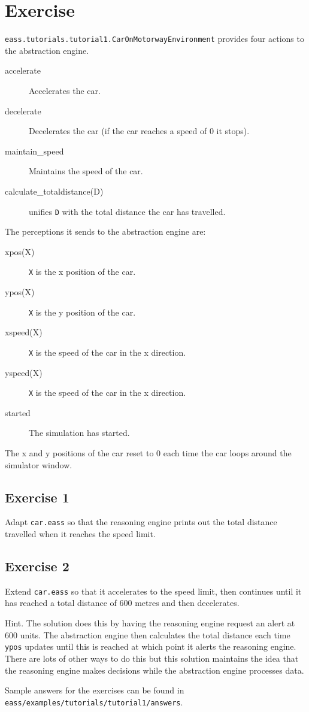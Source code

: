 \section{Exercise}

\texttt{eass.tutorials.tutorial1.CarOnMotorwayEnvironment} provides four actions to the abstraction engine.
\begin{description}
\item[accelerate] Accelerates the car.
\item[decelerate] Decelerates the car (if the car reaches a speed of 0 it stops).
\item[maintain\_speed] Maintains the speed of the car.
\item[calculate\_totaldistance(D)] unifies \texttt{D} with the total distance the car has travelled.
\end{description}

The perceptions it sends to the abstraction engine are:
\begin{description}
\item[xpos(X)] \texttt{X} is the x position of the car.
\item[ypos(X)] \texttt{X} is the y position of the car.
\item[xspeed(X)] \texttt{X} is the speed of the car in the x direction.
\item[yspeed(X)] \texttt{X} is the  speed of the car in the x direction.
\item[started] The simulation has started.
\end{description}
The x and y positions of the car reset to 0 each time the car loops around the simulator window.

\subsection{Exercise 1}
Adapt \texttt{car.eass} so that the reasoning engine prints out the total distance travelled when it reaches the speed limit.

\subsection{Exercise 2}
Extend \texttt{car.eass} so that it accelerates to the speed limit, then continues until it has reached a total distance of 600 metres and then decelerates.  

Hint. The solution does this by having the reasoning engine request an alert at 600 units.  The abstraction engine then calculates the total distance each time \texttt{ypos} updates until this is reached at which point it alerts the reasoning engine.  There are lots of other ways to do this but this solution maintains the idea that the reasoning engine makes decisions while the abstraction engine processes data.  

\begin{sloppypar}
Sample answers for the exercises can be found in \texttt{eass/examples/tutorials/tutorial1/answers}.
\end{sloppypar}

